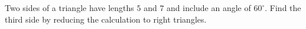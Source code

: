 Two sides of a triangle have lengths $ 5 $ and $ 7 $ and include an angle of $ 60^\circ $. Find the third side by reducing the calculation to right triangles.
